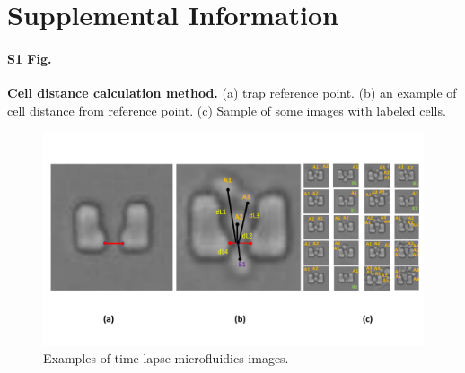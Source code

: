 \documentclass[conference]{IEEEtran}
\begin{document}






\section{Supplemental Information}

\paragraph*{S1 Fig.}
\label{S1_Fig}
{\bf  Cell distance calculation method.} (a) trap reference point. (b) an example of cell distance from reference point. (c) Sample of some images with labeled cells. 


\begin{figure}
\centering
\includegraphics[width=\textwidth,height=10 cm]{Patterns/point.pdf}
\caption{ Examples of time-lapse microfluidics images.}
\label{fig:imageData}
\end{figure} 
\end{document}
